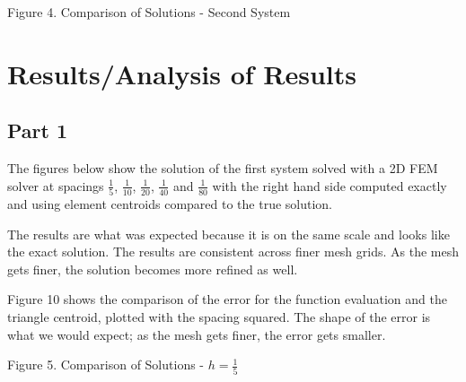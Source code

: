 \documentclass[11pt, oneside]{article}   	%
\begin{document}
\vspace{2mm}

\centerline {}
\centerline{Figure 4. Comparison of Solutions - Second System}

\section{Results/Analysis of Results}

\subsection{Part 1}

The figures below show the solution of the first system solved with a 2D FEM solver at spacings $\frac{1}{5}$, $\frac{1}{10}$, $\frac{1}{20}$, $\frac{1}{40}$ and $\frac{1}{80}$ with the right hand side computed exactly and using element centroids compared to the true solution. 

The results are what was expected because it is on the same scale and looks like the exact solution. The results are consistent across finer mesh grids. As the mesh gets finer, the solution becomes more refined as well. 

Figure 10 shows the comparison of the error for the function evaluation and the triangle centroid, plotted with the spacing squared. The shape of the error is what we would expect; as the mesh gets finer, the error gets smaller.

\centerline {}
\centerline{Figure 5. Comparison of Solutions - $h = \frac{1}{5}$}
\end{document}
